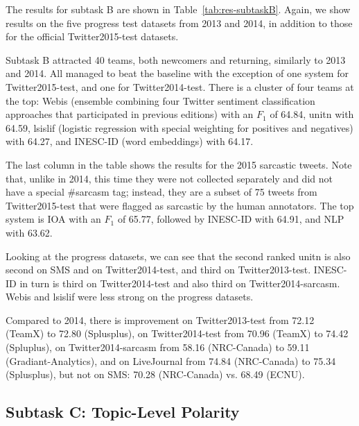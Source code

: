 \documentclass[11pt]{article}
\begin{document}
The results for subtask B are shown in Table~\ref{tab:res-subtaskB}.
Again, we show results on the five progress test datasets from 2013 and 2014,
in addition to those for the official Twitter2015-test datasets.

Subtask B attracted 40 teams, 
both newcomers and returning,
similarly to 2013 and 2014.
All managed to beat the baseline
with the exception of one system for Twitter2015-test,
and one for Twitter2014-test.
There is a cluster of four teams at the top:
Webis (ensemble combining four Twitter sentiment classification approaches
that participated in previous editions) with an $F_1$ of 64.84,
unitn with 64.59,
lsislif (logistic regression with special weighting for positives and negatives) with 64.27,
and
INESC-ID (word embeddings) with 64.17.

The last column in the table shows the results for the 2015 sarcastic tweets. Note that, unlike in 2014, this time they were not collected separately and did not have a special \#sarcasm tag; instead, they are a subset of 75 tweets from Twitter2015-test that were flagged as sarcastic by the human annotators. The top system is
IOA with an $F_1$ of 65.77,
followed by INESC-ID with 64.91,
and NLP with 63.62.

Looking at the progress datasets,
we can see that the second ranked unitn is also second on SMS and on Twitter2014-test,
and third on Twitter2013-test.
INESC-ID in turn is third on Twitter2014-test and also third on Twitter2014-sarcasm.
Webis and lsislif were less strong on the progress datasets.

Compared to 2014,
there is improvement on Twitter2013-test from 72.12 (TeamX) to 72.80 (Splusplus),
on Twitter2014-test from 70.96 (TeamX) to 74.42 (Spluplus),
on Twitter2014-sarcasm from 58.16 (NRC-Canada) to 59.11 (Gradiant-Analytics),
and on LiveJournal from 74.84 (NRC-Canada) to 75.34 (Splusplus),
but not on SMS: 70.28 (NRC-Canada) vs. 68.49 (ECNU).




\subsection{Subtask C: Topic-Level Polarity}
\end{document}
